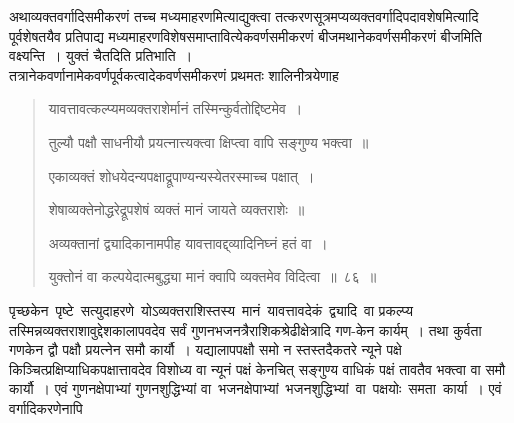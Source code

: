 \documentclass[11pt, openany]{book}
\begin{document}
 \vspace{-4mm}
 अथाव्यक्तवर्गादिसमीकरणं तच्च मध्यमाहरणमित्याद्युक्त्वा
तत्करणसूत्रमप्यव्यक्तवर्गादिपदावशेषमित्यादि पूर्वशेषतयैव प्रतिपाद्य
मध्यमाहरणविशेषसमाप्तावित्येकवर्णसमीकरणं बीजमथानेकवर्णसमीकरणं बीजमिति वक्ष्यन्ति~। युक्तं चैतदिति प्रतिभाति~। \\

\vspace{-2mm}
तत्रानेकवर्णानामेकवर्णपूर्वकत्वादेकवर्णसमीकरणं प्रथमतः शालिनीत्रयेणाह\textendash

 \label{86}
\begin{quote}
\ab 
\hspace{-10mm} यावत्तावत्कल्प्यमव्यक्तराशेर्मानं तस्मिन्कुर्वतोद्दिष्टमेव~। \\
\vspace{-6.5mm}

\hspace{-10mm} तुल्यौ पक्षौ साधनीयौ प्रयत्नात्त्यक्त्वा क्षिप्त्वा वापि सङ्गुण्य भक्त्वा~॥\\
\vspace{-6.5mm}

\hspace{-10mm} एकाव्यक्तं शोधयेदन्यपक्षाद्रूपाण्यन्यस्येतरस्माच्च पक्षात्~। \\
\vspace{-6.5mm}

\hspace{-10mm} शेषाव्यक्तेनोद्धरेद्रूपशेषं व्यक्तं मानं जायते व्यक्तराशेः~॥\\
\vspace{-6.5mm}

\hspace{-10mm} अव्यक्तानां द्व्यादिकानामपीह यावत्तावद्द्व्यादिनिघ्नं हतं वा~। \\
\vspace{-6.5mm}

\hspace{-10mm} युक्तोनं वा कल्पयेदात्मबुद्ध्या मानं क्वापि व्यक्तमेव विदित्वा~॥~८६~॥
\end{quote}
\newpage
 पृच्छकेन \,पृष्टे \,सत्युदाहरणे \,योऽव्यक्तराशिस्तस्य \,मानं \,यावत्तावदेकं \,द्व्यादि \,वा प्रकल्प्य तस्मिन्नव्यक्तराशावुद्देशकालापवदेव सर्वं
गुणनभजनत्रैराशिकश्रेढीक्षेत्रादि गण-केन 
कार्यम्~। तथा कुर्वता गणकेन द्वौ पक्षौ प्रयत्नेन समौ कार्यौ~।
यद्यालापपक्षौ समो न 
स्तस्तदैकतरे न्यूने पक्षे किञ्चित्प्रक्षिप्याधिकपक्षात्तावदेव विशोध्य वा
न्यूनं पक्षं केनचित् सङ्गुण्य वाधिकं पक्षं तावतैव भक्त्वा वा समौ कार्यौ~। एवं गुणनक्षेपाभ्यां गुणनशुद्धिभ्यां वा \,भजनक्षेपाभ्यां \,भजनशुद्धिभ्यां \,वा \,पक्षयोः \,समता \,कार्या~। एवं \,वर्गादिकरणेनापि 
\end{document}
